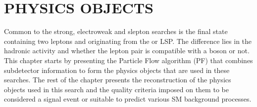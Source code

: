 \chapter{PHYSICS OBJECTS}\label{sec:objects}
Common to the strong, electroweak and slepton searches is the final state containing two leptons and \ptmiss originating from the \PSGczDo or \gravitino LSP.
The difference lies in the hadronic activity and whether the lepton pair is compatible with a \PZ boson or not. 
This chapter starts by presenting the Particle Flow algorithm (PF) that combines subdetector information to form the physics objects that are used in these searches. 
The rest of the chapter presents the reconstruction of the physics objects used in this search and the quality criteria imposed on them to be considered a signal event or suitable to predict various SM background processes.  
